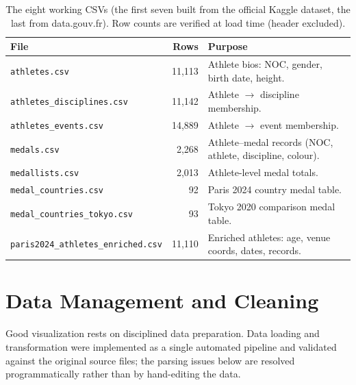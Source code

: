 \documentclass[11pt]{article}
\begin{document}
\begin{table}[htbp]
\centering\small\sffamily
\renewcommand{\arraystretch}{1.18}
\begin{tabularx}{\linewidth}{l r X}
\toprule
\rowcolor{charcoal}\textbf{\color{white}File} & \textbf{\color{white}Rows} & \textbf{\color{white}Purpose} \\
\midrule
\texttt{athletes.csv}                  & 11{,}113 & Athlete bios: NOC, gender, birth date, height. \\
\texttt{athletes\_disciplines.csv}     & 11{,}142 & Athlete $\rightarrow$ discipline membership. \\
\texttt{athletes\_events.csv}          & 14{,}889 & Athlete $\rightarrow$ event membership. \\
\texttt{medals.csv}                    &  2{,}268 & Athlete--medal records (NOC, athlete, discipline, colour). \\
\texttt{medallists.csv}                &  2{,}013 & Athlete-level medal totals. \\
\texttt{medal\_countries.csv}          &     92 & Paris 2024 country medal table. \\
\texttt{medal\_countries\_tokyo.csv}   &     93 & Tokyo 2020 comparison medal table. \\
\texttt{paris2024\_athletes\_enriched.csv} & 11{,}110 & Enriched athletes: age, venue coords, dates, records. \\
\bottomrule
\end{tabularx}
\caption{The eight working CSVs (the first seven built from the official Kaggle
dataset, the last from data.gouv.fr). Row counts are verified at load time (header excluded).}
\label{tab:files}
\end{table}

\section{Data Management and Cleaning}
\label{sec:cleaning}

Good visualization rests on disciplined data preparation. Data loading and
transformation were implemented as a single automated pipeline and validated
against the original source files; the parsing issues below are resolved
programmatically rather than by hand-editing the data.
\end{document}
